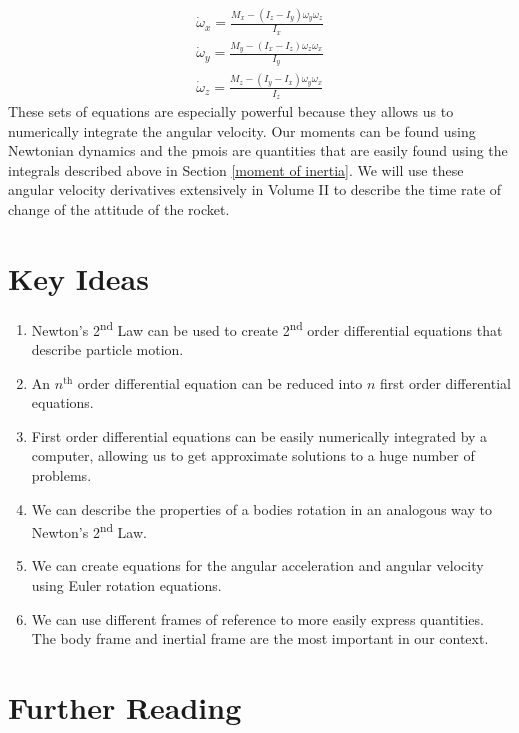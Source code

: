\documentclass[12pt]{report}
\begin{document}
\begin{gather}\label{eq: moment eq 2}
    \dot{\omega}_x=\frac{M_x-\left(I_z-I_y\right)\omega_y\omega_z}{I_x}\\
    \dot{\omega}_y=\frac{M_y-\left(I_x-I_z\right)\omega_z\omega_x}{I_y}\\
    \dot{\omega}_z=\frac{M_z-\left(I_y-I_x\right)\omega_y\omega_x}{I_z}
\end{gather}
These sets of equations are especially powerful because they allows us to numerically integrate the angular velocity. Our moments can be found using Newtonian dynamics and the \glspl{pmoi} are quantities that are easily found using the integrals described above in Section \ref{moment of inertia}. We will use these angular velocity derivatives extensively in Volume II to describe the time rate of change of the attitude of the rocket.

\section{Key Ideas}
\begin{enumerate}
    \item Newton's 2\textsuperscript{nd} Law can be used to create 2\textsuperscript{nd} order differential equations that describe particle motion.
    \item An $n^{\mathrm{th}}$ order differential equation can be reduced into $n$ first order differential equations.
    \item First order differential equations can be easily numerically integrated by a computer, allowing us to get approximate solutions to a huge number of problems.
    \item We can describe the properties of a bodies rotation in an analogous way to Newton's 2\textsuperscript{nd} Law.
    \item We can create equations for the angular acceleration and angular velocity using Euler rotation equations.
    \item We can use different frames of reference to more easily express quantities. The body frame and inertial frame are the most important in our context.
    
\end{enumerate}

\section{Further Reading}
\end{document}

